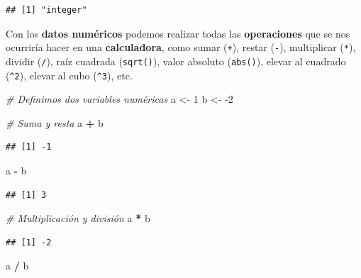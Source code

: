\documentclass[11pt,]{book}
\newenvironment{Shaded}{\begin{snugshade}}{\end{snugshade}}
\newcommand{\CommentTok}[1]{\textcolor[rgb]{0.37,0.37,0.37}{\textit{#1}}}
\newcommand{\DecValTok}[1]{\textcolor[rgb]{0.06,0.06,0.06}{#1}}
\newcommand{\NormalTok}[1]{#1}
\newcommand{\OperatorTok}[1]{\textcolor[rgb]{0.43,0.43,0.43}{\textbf{#1}}}
\newcommand{\StringTok}[1]{\textcolor[rgb]{0.5,0.5,0.5}{#1}}
\begin{document}
\begin{verbatim}
## [1] "integer"
\end{verbatim}

Con los \textbf{datos numéricos} podemos realizar todas las \textbf{operaciones} que se nos ocurriría hacer en una \textbf{calculadora}, como sumar (\texttt{+}), restar (\texttt{-}), multiplicar (\texttt{*}), dividir (\texttt{/}), raíz cuadrada (\texttt{sqrt()}), valor absoluto (\texttt{abs()}), elevar al cuadrado (\texttt{\^{}2}), elevar al cubo (\texttt{\^{}3}), etc.

\begin{Shaded}
\begin{Highlighting}[]
\CommentTok{# Definimos dos variables numéricas}
\NormalTok{a <-}\StringTok{ }\DecValTok{1}
\NormalTok{b <-}\StringTok{ }\DecValTok{-2}

\CommentTok{# Suma y resta}
\NormalTok{a }\OperatorTok{+}\StringTok{ }\NormalTok{b}
\end{Highlighting}
\end{Shaded}

\begin{verbatim}
## [1] -1
\end{verbatim}

\begin{Shaded}
\begin{Highlighting}[]
\NormalTok{a }\OperatorTok{-}\StringTok{ }\NormalTok{b}
\end{Highlighting}
\end{Shaded}

\begin{verbatim}
## [1] 3
\end{verbatim}

\begin{Shaded}
\begin{Highlighting}[]
\CommentTok{# Multiplicación y división}
\NormalTok{a }\OperatorTok{*}\StringTok{ }\NormalTok{b}
\end{Highlighting}
\end{Shaded}

\begin{verbatim}
## [1] -2
\end{verbatim}

\begin{Shaded}
\begin{Highlighting}[]
\NormalTok{a }\OperatorTok{/}\StringTok{ }\NormalTok{b}
\end{Highlighting}
\end{Shaded}
\end{document}
